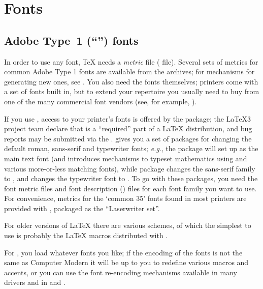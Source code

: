 
\section{Fonts}

\subsection{Adobe Type~1 (``\PS{}'') fonts}


In order to use any font, \TeX{} needs a
\emph{metric} file ( file).  Several sets of metrics for
common Adobe Type 1 fonts are
available from the archives; for mechanisms for generating new ones,
see .  You
also need the fonts themselves; \PS{} printers come with a set of
fonts built in, but to extend your repertoire you usually
need to buy from one of the many commercial font vendors (see, for
example, ).

If you use \LaTeXe{}, access to your printer's fonts is offered by the
 package; the \LaTeX{}3 project team declare that
 is a ``required'' part of a \LaTeX{} distribution, and
bug reports may be submitted via the %
. 
 gives you a set of packages for changing the default
roman, sans-serif and typewriter fonts; \emph{e.g}., the
 package will set up 
 as the main text font (and introduces mechanisms to
typeset mathematics using  and various more-or-less
matching fonts),  while package  changes the sans-serif
family to , and  changes the
typewriter font to .  To go with these
packages, you need the font metric files
and font description () files for each font family you
want to use.  For convenience,
metrics for the `common 35' \PS{} fonts found in most \PS{} printers
are provided with , packaged as the ``Laserwriter set''.

For older versions of \LaTeX{} there are various schemes, of which the
simplest to use is probably the \LaTeX{} macros distributed with
.

For \plaintex{}, you load whatever fonts you like; if the encoding of
the fonts is not the same as Computer Modern it will be up to you to
redefine various macros and accents, or you can use the font
re-encoding mechanisms available in many drivers and in
 and .

